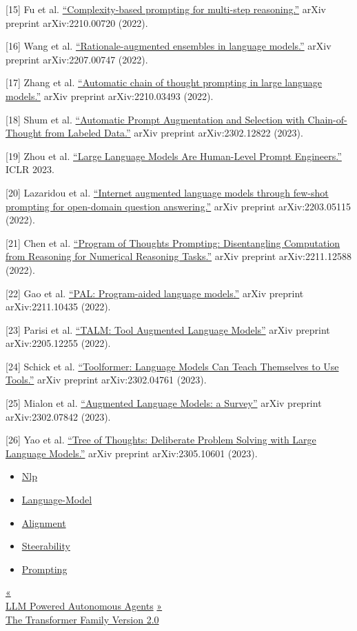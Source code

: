 {[}15{]} Fu et al. \href{https://arxiv.org/abs/2210.00720}{``Complexity-based prompting for multi-step reasoning.''} arXiv preprint arXiv:2210.00720 (2022).

{[}16{]} Wang et al. \href{https://arxiv.org/abs/2207.00747}{``Rationale-augmented ensembles in language models.''} arXiv preprint arXiv:2207.00747 (2022).

{[}17{]} Zhang et al. \href{https://arxiv.org/abs/2210.03493}{``Automatic chain of thought prompting in large language models.''} arXiv preprint arXiv:2210.03493 (2022).

{[}18{]} Shum et al. \href{https://arxiv.org/abs/2302.12822}{``Automatic Prompt Augmentation and Selection with Chain-of-Thought from Labeled Data.''} arXiv preprint arXiv:2302.12822 (2023).

{[}19{]} Zhou et al. \href{https://arxiv.org/abs/2211.01910}{``Large Language Models Are Human-Level Prompt Engineers.''} ICLR 2023.

{[}20{]} Lazaridou et al. \href{https://arxiv.org/abs/2203.05115}{``Internet augmented language models through few-shot prompting for open-domain question answering.''} arXiv preprint arXiv:2203.05115 (2022).

{[}21{]} Chen et al. \href{https://arxiv.org/abs/2211.12588}{``Program of Thoughts Prompting: Disentangling Computation from Reasoning for Numerical Reasoning Tasks.''} arXiv preprint arXiv:2211.12588 (2022).

{[}22{]} Gao et al. \href{https://arxiv.org/abs/2211.10435}{``PAL: Program-aided language models.''} arXiv preprint arXiv:2211.10435 (2022).

{[}23{]} Parisi et al. \href{https://arxiv.org/abs/2205.12255}{``TALM: Tool Augmented Language Models''} arXiv preprint arXiv:2205.12255 (2022).

{[}24{]} Schick et al. \href{https://arxiv.org/abs/2302.04761}{``Toolformer: Language Models Can Teach Themselves to Use Tools.''} arXiv preprint arXiv:2302.04761 (2023).

{[}25{]} Mialon et al. \href{https://arxiv.org/abs/2302.07842}{``Augmented Language Models: a Survey''} arXiv preprint arXiv:2302.07842 (2023).

{[}26{]} Yao et al. \href{https://arxiv.org/abs/2305.10601}{``Tree of Thoughts: Deliberate Problem Solving with Large Language Models.''} arXiv preprint arXiv:2305.10601 (2023).

\begin{itemize}
\tightlist
\item
  \href{https://lilianweng.github.io/tags/nlp/}{Nlp}
\item
  \href{https://lilianweng.github.io/tags/language-model/}{Language-Model}
\item
  \href{https://lilianweng.github.io/tags/alignment/}{Alignment}
\item
  \href{https://lilianweng.github.io/tags/steerability/}{Steerability}
\item
  \href{https://lilianweng.github.io/tags/prompting/}{Prompting}
\end{itemize}

\href{https://lilianweng.github.io/posts/2023-06-23-agent/}{{« }\\
{LLM Powered Autonomous Agents}} \href{https://lilianweng.github.io/posts/2023-01-27-the-transformer-family-v2/}{{ »}\\
{The Transformer Family Version 2.0}}


